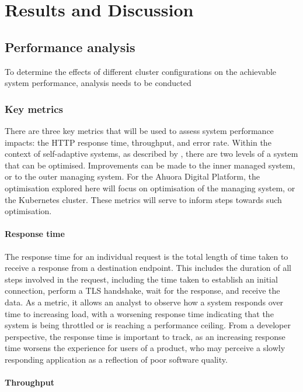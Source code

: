 \chapter{Results and Discussion}

\section{Performance analysis}

To determine the effects of different cluster configurations on the achievable system performance, analysis needs to be conducted 

\subsection{Key metrics}

There are three key metrics that will be used to assess system performance impacts: the HTTP response time, throughput, and error rate. Within the context of self-adaptive systems, as described by \citeauthor{weyns_engineering_2018} \cite{weyns_engineering_2018}, there are two levels of a system that can be optimised. Improvements can be made to the inner managed system, or to the outer managing system. For the Ahuora Digital Platform, the optimisation explored here will focus on optimisation of the managing system, or the Kubernetes cluster. These metrics will serve to inform steps towards such optimisation.

\subsubsection{Response time}

The response time for an individual request is the total length of time taken to receive a response from a destination endpoint. This includes the duration of all steps involved in the request, including the time taken to establish an initial connection, perform a TLS handshake, wait for the response, and receive the data. As a metric, it allows an analyst to observe how a system responds over time to increasing load, with a worsening response time indicating that the system is being throttled or is reaching a performance ceiling. From a developer perspective, the response time is important to track, as an increasing response time worsens the experience for users of a product, who may perceive a slowly responding application as a reflection of poor software quality.

\subsubsection{Throughput}

